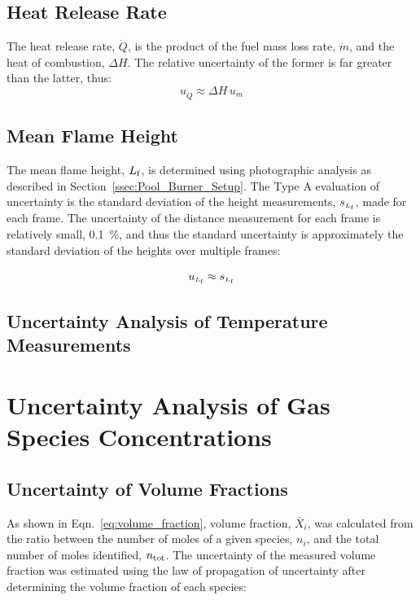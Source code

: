 \documentclass[12pt]{article}
\begin{document}
\subsection{Heat Release Rate}
\label{ssec:Heat_Release_Rate}

The heat release rate, $\dot{Q}$, is the product of the fuel mass loss rate, $\dot{m}$, and the heat of combustion, $\Delta H$. The relative uncertainty of the former is far greater than the latter, thus:
\begin{equation}
\label{eq:heat_release_rate_uncertainty}
u_{\scriptscriptstyle \dot{Q}} \approx \Delta H \, u_{\dot{m}}
\end{equation}

\subsection{Mean Flame Height}
\label{ssec:Mean_Flame_Height}

The mean flame height, ${L_{\rm{f}}}$, is determined using photographic analysis as described in Section~\ref{ssec:Pool_Burner_Setup}. The Type A evaluation of uncertainty is the standard deviation of the height measurements, $s_{\scriptscriptstyle L_{\rm{f}}}$, made for each frame. The uncertainty of the distance measurement for each frame is relatively small, 0.1~\%, and thus the standard uncertainty is approximately the standard deviation of the heights over multiple frames:

\begin{equation}
\label{eq:mean_flame_height}
u_{\scriptscriptstyle L_{\rm{f}}} \approx s_{\scriptscriptstyle{L_{\rm f}}}
\end{equation}


\subsection{Uncertainty Analysis of Temperature Measurements}
\label{sec:Uncertainty_Temperature_Measurements}



\section{Uncertainty Analysis of Gas Species Concentrations} \label{sec:UncertaintyGasSpecies}

\subsection{Uncertainty of Volume Fractions} \label{sec:UncertaintyMoleFrac}
As shown in Eqn.~\ref{eq:volume_fraction}, volume fraction, $\bar{X}_{i}$, was calculated from the ratio between the number of moles of a given species, $n_{i}$, and the total number of moles identified, $n_{\rm tot}$. The uncertainty of the measured volume fraction was estimated using the law of propagation of uncertainty after determining the volume fraction of each species:
\end{document}
